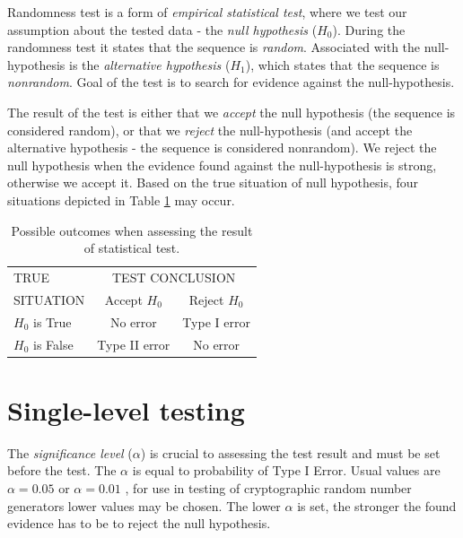\documentclass[
  digital,     %
  oneside,     %
  nosansbold,  %
  nocolorbold, %
  nolof,         %
  nolot,         %
]{fithesis4}
\begin{document}

Randomness test is a form of \emph{empirical statistical test}, where we test our assumption about the tested data - the \emph{null hypothesis} ($H_0$). During the randomness test it states that the sequence is \emph{random}. Associated with the null-hypothesis is the \emph{alternative hypothesis} ($H_1$), which states that the sequence is \emph{nonrandom}. Goal of the test is to search for evidence against the null-hypothesis. \cite[p. 2]{tu01_guide}



The result of the test is either that we \emph{accept} the null hypothesis (the sequence is considered random), or that we \emph{reject} the null-hypothesis (and accept the alternative hypothesis - the sequence is considered nonrandom). We reject the null hypothesis when the evidence found against the null-hypothesis is strong, otherwise we accept it. Based on the true situation of null hypothesis, four situations depicted in Table \ref{tab:type_errors} may occur. \cite[p. 417]{basic_practice}

\begin{table}
  \begin{tabularx}{0.7\textwidth}{l|c|c}
    TRUE  & \multicolumn{2}{c}{TEST CONCLUSION}\\
    SITUATION &Accept $H_0$ & Reject $H_0$\\
    \midrule
    $H_0$ is True &  No error & Type I error  \\
    $H_0$ is False & Type II error & No error \\
  \end{tabularx}
  \caption{Possible outcomes when assessing the result of statistical test.}
  \label{tab:type_errors}
\end{table}

\section{Single-level testing} \label{chap:rand-single}

The \emph{significance level} ($\alpha$) is crucial to assessing the test result and must be set before the test. The $\alpha$ is equal to probability of Type I Error. Usual values are $\alpha = 0.05$ or $\alpha = 0.01$ \cite[p. 390]{basic_practice}, for use in testing of cryptographic random number generators lower values may be chosen. \cite[p. 1-4]{nist_special} The lower $\alpha$ is set, the stronger the found evidence has to be to reject the null hypothesis. %
\end{document}
